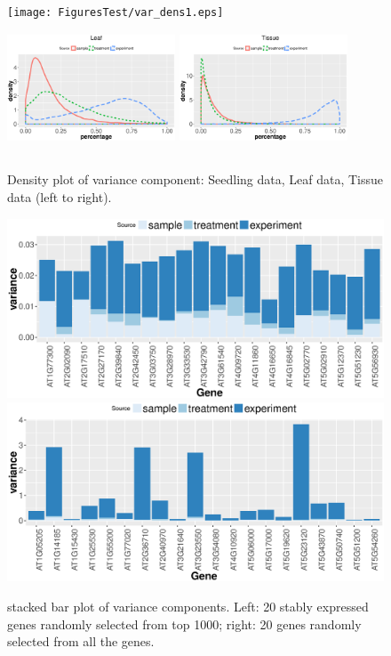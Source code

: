 \documentclass[11pt, a4paper]{article}
\begin{document}
 \begin{figure}[h]
\begin{center}
\texttt{[image: FiguresTest/var\_dens1.eps]}
\includegraphics[width=5cm,height=4cm]{Figures/var_dens2.eps}
\includegraphics[width=5cm,height=4cm]{Figures/var_dens3.eps}
\caption{ Density plot of variance component: Seedling data, Leaf data, Tissue data (left to right).}
\label{fig:densityplot}
\end{center}
\end{figure} 


\begin{figure}[!h]
	\centering
	\includegraphics[width=0.8\linewidth]{Figures/top1000.eps}
	\includegraphics[width=0.8\linewidth]{Figures/all.eps}
	\caption{stacked bar plot of variance components. Left: 20 stably expressed genes randomly selected from top 1000; right: 20 genes randomly selected from all the genes.}
	\label{fig:all}
\end{figure}
\end{document}
